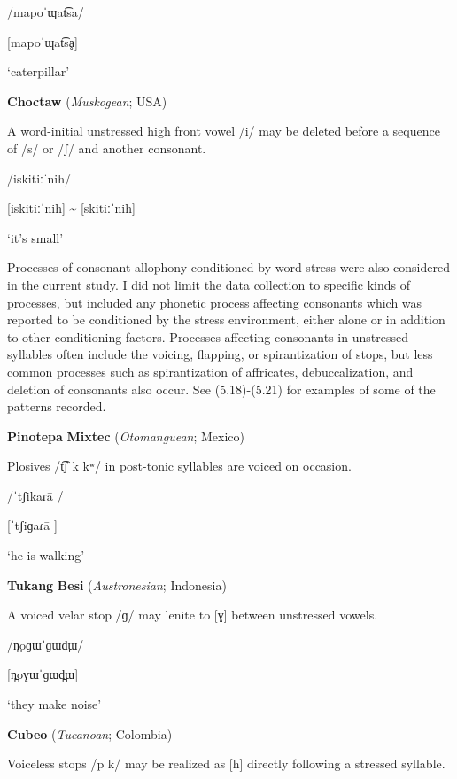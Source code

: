 /mapoˈɰat͡sa/

[mapoˈɰat͡sḁ]

‘caterpillar’

\citep[60-1]{Facundes2000}
\z

\ea\label{ex:(5.17)}
  \textbf{Choctaw} (\textit{Muskogean}; USA)

A word-initial unstressed high front vowel /i/ may be deleted before a sequence of /s/ or /ʃ/ and another consonant.

/iskitiːˈnih/

[iskitiːˈnih] {\textasciitilde} [skitiːˈnih]

‘it’s small’

\citep[19]{Broadwell2006}
\z

  Processes of consonant allophony conditioned by word stress were also considered in the current study. I did not limit the data collection to specific kinds of processes, but included any phonetic process affecting consonants which was reported to be conditioned by the stress environment, either alone or in addition to other conditioning factors. Processes affecting consonants in unstressed syllables often include the voicing, flapping, or spirantization of stops, but less common processes such as spirantization of affricates, debuccalization, and deletion of consonants also occur. See (5.18)-(5.21) for examples of some of the patterns recorded.

\ea\label{ex:(5.18)}
  \textbf{Pinotepa} \textbf{Mixtec} (\textit{Otomanguean}; Mexico)

Plosives /t͡ʃ k kʷ/ in post-tonic syllables are voiced on occasion.

/ˈtʃikaɾa\={} /

[ˈtʃiɡaɾa\={} ]

‘he is walking’

\citep[5]{Bradley1970}
\z

\ea\label{ex:(5.19)}
  \textbf{Tukang} \textbf{Besi} (\textit{Austronesian}; Indonesia)

A voiced velar stop /ɡ/ may lenite to [ɣ] between unstressed vowels.

/n̪oɡɯˈɡɯd̪ɯ/

[n̪oɣɯˈɡɯd̪ɯ]

‘they make noise’

\citep[27]{Donohue1999}

\z

\ea\label{ex:(5.20)}
  \textbf{Cubeo} (\textit{Tucanoan}; Colombia)

Voiceless stops /p k/ may be realized as [h] directly following a stressed syllable.

